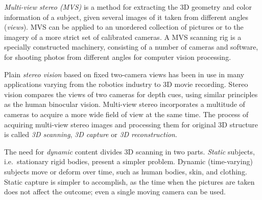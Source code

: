 

\emph{Multi-view stereo (MVS)} is a method for extracting the 3D geometry and color information of a subject, given several images of it taken from different angles (\emph{views}).
MVS can be applied to an unordered collection of pictures or to the imagery of a more strict set of calibrated cameras.
A MVS scanning rig is a specially constructed machinery, consisting of a number of cameras and software, for shooting photos from different angles for computer vision processing.


Plain \emph{stereo vision} based on fixed two-camera views has been in use in many applications varying from the robotics industry to 3D movie recording.
Stereo vision compares the views of two cameras for depth cues, using similar principles as the human binocular vision.
Multi-view stereo incorporates a multitude of cameras to acquire a more wide field of view at the same time.
The process of acquiring multi-view stereo images and processing them for original 3D structure is called \emph{3D scanning}, \emph{3D capture} or \emph{3D reconstruction}.


The need for \emph{dynamic} content divides 3D scanning in two parts.
\emph{Static} subjects, i.e.\ stationary rigid bodies, present a simpler problem.
Dynamic (time-varying) subjects move or deform over time, such as human bodies, skin, and clothing.
Static capture is simpler to accomplish, as the time when the pictures are taken does not affect the outcome; even a single moving camera can be used.



